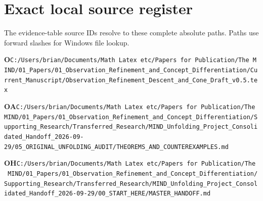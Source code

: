 \documentclass[10pt,letterpaper]{article}
\begin{document}
\section*{Exact local source register}

The evidence-table source IDs resolve to these complete absolute paths. Paths use forward slashes for Windows file lookup.\par

\begingroup\footnotesize\sloppy
\setlength{\parskip}{4pt}
\noindent\textbf{O}\quad \texttt{C:/\allowbreak{}Users/\allowbreak{}brian/\allowbreak{}Documents/\allowbreak{}Math\ Latex\ etc/\allowbreak{}Papers\ for\ Publication/\allowbreak{}The\ MIND/\allowbreak{}01\_\allowbreak{}Papers/\allowbreak{}01\_\allowbreak{}Observation\_\allowbreak{}Refinement\_\allowbreak{}and\_\allowbreak{}Concept\_\allowbreak{}Differentiation/\allowbreak{}Current\_\allowbreak{}Manuscript/\allowbreak{}Observation\_\allowbreak{}Refinement\_\allowbreak{}Descent\_\allowbreak{}and\_\allowbreak{}Cone\_\allowbreak{}Draft\_\allowbreak{}v0.5.tex}\par
\noindent\textbf{OA}\quad \texttt{C:/\allowbreak{}Users/\allowbreak{}brian/\allowbreak{}Documents/\allowbreak{}Math\ Latex\ etc/\allowbreak{}Papers\ for\ Publication/\allowbreak{}The\ MIND/\allowbreak{}01\_\allowbreak{}Papers/\allowbreak{}01\_\allowbreak{}Observation\_\allowbreak{}Refinement\_\allowbreak{}and\_\allowbreak{}Concept\_\allowbreak{}Differentiation/\allowbreak{}Supporting\_\allowbreak{}Research/\allowbreak{}Transferred\_\allowbreak{}Research/\allowbreak{}MIND\_\allowbreak{}Unfolding\_\allowbreak{}Project\_\allowbreak{}Consolidated\_\allowbreak{}Handoff\_\allowbreak{}2026-\allowbreak{}09-\allowbreak{}29/\allowbreak{}05\_\allowbreak{}ORIGINAL\_\allowbreak{}UNFOLDING\_\allowbreak{}AUDIT/\allowbreak{}THEOREMS\_\allowbreak{}AND\_\allowbreak{}COUNTEREXAMPLES.md}\par
\noindent\textbf{OH}\quad \texttt{C:/\allowbreak{}Users/\allowbreak{}brian/\allowbreak{}Documents/\allowbreak{}Math\ Latex\ etc/\allowbreak{}Papers\ for\ Publication/\allowbreak{}The\ MIND/\allowbreak{}01\_\allowbreak{}Papers/\allowbreak{}01\_\allowbreak{}Observation\_\allowbreak{}Refinement\_\allowbreak{}and\_\allowbreak{}Concept\_\allowbreak{}Differentiation/\allowbreak{}Supporting\_\allowbreak{}Research/\allowbreak{}Transferred\_\allowbreak{}Research/\allowbreak{}MIND\_\allowbreak{}Unfolding\_\allowbreak{}Project\_\allowbreak{}Consolidated\_\allowbreak{}Handoff\_\allowbreak{}2026-\allowbreak{}09-\allowbreak{}29/\allowbreak{}00\_\allowbreak{}START\_\allowbreak{}HERE/\allowbreak{}MASTER\_\allowbreak{}HANDOFF.md}\par
\end{document}
